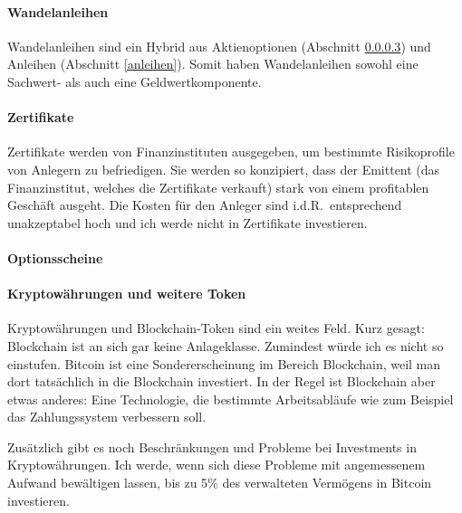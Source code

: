 \documentclass{article}
\begin{document}
\paragraph{Wandelanleihen} 

Wandelanleihen sind ein Hybrid aus Aktienoptionen (Abschnitt \ref{optionsscheine}) und Anleihen (Abschnitt \ref{anleihen}). Somit haben Wandelanleihen sowohl eine Sachwert- als auch eine Geldwertkomponente.

\paragraph{Zertifikate}

Zertifikate werden von Finanzinstituten ausgegeben, um bestimmte Risikoprofile von Anlegern zu befriedigen. Sie werden so konzipiert, dass der Emittent (das Finanzinstitut, welches die Zertifikate verkauft) stark von einem profitablen Geschäft ausgeht. Die Kosten für den Anleger sind i.d.R.\ entsprechend unakzeptabel hoch und ich werde nicht in Zertifikate investieren.

\paragraph{Optionsscheine} \label{optionsscheine}

\paragraph{Kryptowährungen und weitere Token}

Kryptowährungen und Blockchain-Token sind ein weites Feld. Kurz gesagt: Blockchain ist an sich gar keine Anlageklasse. Zumindest würde ich es nicht so einstufen. Bitcoin ist eine Sondererscheinung im Bereich Blockchain, weil man dort tatsächlich in die Blockchain investiert. In der Regel ist Blockchain aber etwas anderes: Eine Technologie, die bestimmte Arbeitsabläufe wie zum Beispiel das Zahlungssystem verbessern soll.

Zusätzlich gibt es noch Beschränkungen und Probleme bei Investments in Kryptowährungen. Ich werde, wenn sich diese Probleme mit angemessenem Aufwand bewältigen lassen, bis zu 5\% des verwalteten Vermögens in Bitcoin investieren.
\end{document}
